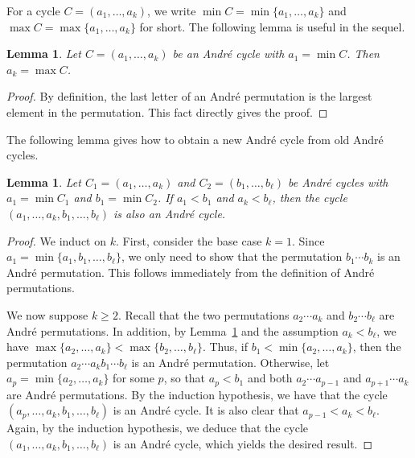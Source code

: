 \documentclass[reqno,12pt]{amsart}
\newtheorem{lem}[thm]{Lemma}
\theoremstyle{definition}
\theoremstyle{remark}
\begin{document}
For a cycle \( C=(a_1,\dots,a_k) \), we write \( \min C = \min \{a_1,\dots,a_k\} \)
and \( \max C = \max \{a_1,\dots,a_k\}\) for short.
The following lemma is useful in the sequel.
\begin{lem} \label{lem:cycle_minmax}
  Let \( C=(a_1,\dots,a_k) \) be an Andr\'e cycle with \( a_1=\min C \).
  Then \( a_k=\max C \).
\end{lem}
\begin{proof}
  By definition, the last letter of an Andr\'e permutation is the largest element
  in the permutation. This fact directly gives the proof.
\end{proof}
The following lemma gives how to obtain a new Andr\'e cycle from old Andr\'e cycles.
\begin{lem} \label{lem:merging}
  Let \( C_1=(a_1,\dots,a_k) \) and \( C_2=(b_1,\dots,b_\ell) \) be Andr\'e cycles with
  \( a_1 = \min C_1 \) and \( b_1=\min C_2 \).
  If \( a_1<b_1 \) and \( a_k<b_\ell \), then the cycle \( (a_1,\dots,a_k, b_1,\dots,b_\ell) \) is also an Andr\'e cycle.
\end{lem}
\begin{proof}
  We induct on \( k \). First, consider the base case \( k=1 \).
  Since \( a_1 = \min\{a_1,b_1,\dots,b_\ell\} \), we only need to show that the
  permutation \( b_1\cdots b_k \) is an Andr\'e permutation.
  This follows immediately from the definition of Andr\'e permutations.
  
  We now suppose \( k\ge 2 \).
  Recall that the two permutations \( a_2\cdots a_k \) and \( b_2\cdots b_\ell \)
  are Andr\'e permutations. In addition, by Lemma~\ref{lem:cycle_minmax} and
  the assumption \( a_k< b_\ell \),
  we have \( \max\{a_2,\dots,a_k\}<\max\{b_2,\dots,b_\ell\} \).
  Thus, if \( b_1< \min\{a_2,\dots,a_k\} \),
  then the permutation \( a_2\cdots a_k b_1\cdots b_\ell \) is an Andr\'e permutation.
  Otherwise, let \( a_p=\min\{a_2,\dots,a_k\} \) for some \( p \), so that \( a_p < b_1 \)
  and both \( a_2\cdots a_{p-1} \) and \( a_{p+1}\cdots a_k \) are Andr\'e permutations.
  By the induction hypothesis, we have that
  the cycle \( (a_p,\dots,a_k,b_1,\dots,b_\ell) \) is an Andr\'e cycle.
  It is also clear that \( a_{p-1} < a_k < b_\ell \).
  Again, by the induction hypothesis,
  we deduce that the cycle \( (a_1,\dots,a_k, b_1,\dots,b_\ell) \) is an Andr\'e cycle, which yields the desired result.
\end{proof}
\end{document}
